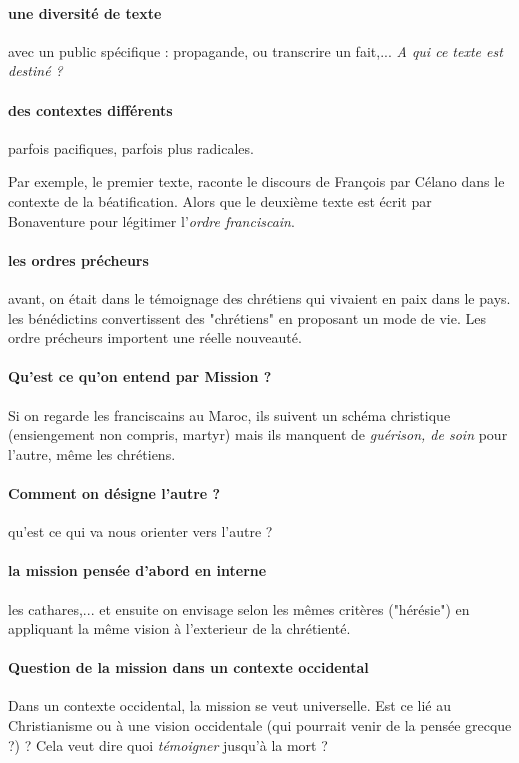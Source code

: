 \paragraph{une diversité de texte} avec un public spécifique : propagande, ou transcrire un fait,... \textit{A qui ce texte est destiné ?}

\paragraph{des contextes différents} parfois pacifiques, parfois plus radicales. 
\begin{Ex}
Par exemple, le premier texte, raconte le discours de François par Célano dans le contexte de la béatification. Alors que le deuxième texte est écrit par Bonaventure pour légitimer l'\textit{ordre franciscain}.
\end{Ex}

\paragraph{les ordres précheurs} avant, on était dans le témoignage des chrétiens qui vivaient en paix dans le pays. les bénédictins convertissent des "chrétiens"  en proposant un mode de vie. Les ordre précheurs importent une réelle nouveauté.



\paragraph{Qu'est ce qu'on entend par Mission ?} Si on regarde les franciscains au Maroc, ils suivent un schéma christique (ensiengement non compris, martyr) mais ils manquent de \textit{guérison, de soin} pour l'autre, même les chrétiens. 

\paragraph{Comment on désigne l'autre ?} qu'est ce qui va nous orienter vers l'autre ?

\paragraph{la mission pensée d'abord en interne} les cathares,... et ensuite on envisage selon les mêmes critères ("hérésie") en appliquant la même vision à l'exterieur de la chrétienté.

\paragraph{Question de la mission dans un contexte occidental} Dans un contexte occidental, la mission se veut universelle. Est ce lié au Christianisme ou à une vision occidentale (qui pourrait venir de la pensée grecque ?) ?
Cela veut dire quoi \textit{témoigner} jusqu'à la mort ? 
